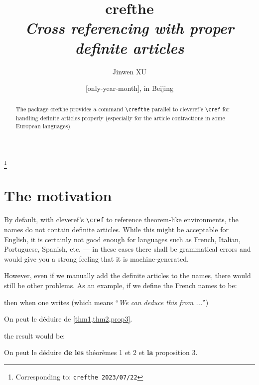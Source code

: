\documentclass[classical]{einfart}
\newenvironment{demo}
  {%
    \LocallyStopLineNumbers%
    \begin{tcolorbox}[enhanced jigsaw,pad at break*=1mm,breakable,
        left=2.5mm,right=3mm,top=0.5mm,bottom=0mm,
        colback=gray!5!paper,boxrule=0pt,frame hidden,
        borderline west={1.2mm}{0mm}{gray!55!paper},arc=.7mm]%
  }
  {%
    \end{tcolorbox}%
    \ResumeLineNumbers%
  }
\newcommand{\crefthepackage}{\textsf{crefthe}}
\begin{document}
\def\PackageVersion{2023/07/22}

\title{\crefthepackage{}\\\smallskip\itshape Cross referencing with proper definite articles}
\author{Jinwen XU}
\thanks{Corresponding to: \texttt{\crefthepackage{} \PackageVersion}}
\date{\TheDate{\PackageVersion}[only-year-month], in Beijing}

\maketitle

\begin{abstract}
    \raggedleft
    The package \crefthepackage{} provides a command \lstinline|\crefthe| parallel to \textsf{cleveref}'s \lstinline|\cref| for handling definite articles properly (especially for the article contractions in some European languages).
\end{abstract}

\section{The motivation}

By default, with \textsf{cleveref}'s \lstinline|\cref| to reference theorem-like environments, the names do not contain definite articles. While this might be acceptable for English, it is certainly not good enough for languages such as French, Italian, Portuguese, Spanish, etc. --- in these cases there shall be grammatical errors and would give you a strong feeling that it is machine-generated.

However, even if we manually add the definite articles to the names, there would still be other problems. As an example, if we define the French names to be:

\begin{code}
\end{code}

then when one writes (which means ``\emph{We can deduce this from ...}'')

\begin{code}
On peut le déduire de \cref{thm1,thm2,prop3}.
\end{code}

the result would be:

\begin{demo}
    On peut le déduire \textbf{de les} théorèmes 1 et 2 et \textbf{la} proposition 3.
\end{demo}
\end{document}
